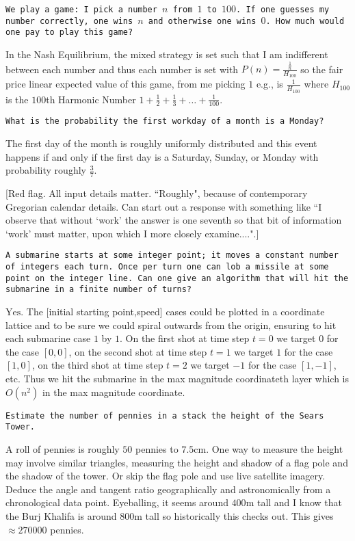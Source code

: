 \texttt{We play a game: I pick a number $n$ from $1$ to $100$. If one guesses my number correctly, one wins $n$ and otherwise one wins $0$. How much would one pay to play this game?}

In the Nash Equilibrium, the mixed strategy is set such that I am indifferent between each number and thus each number is set with $P(n)=\frac{\frac{1}{n}}{H_{100}}$ so the fair price linear expected value of this game, from me picking $1$ e.g., is $\boxed{\frac{1}{H_{100}}}$ where $H_{100}$ is the $100$th Harmonic Number $1+\frac{1}{2}+\frac{1}{3}+\dots+\frac{1}{100}$.

\texttt{What is the probability the first workday of a month is a Monday?}

The first day of the month is roughly uniformly distributed and this event happens if and only if the first day is a Saturday, Sunday, or Monday with probability roughly $\boxed{\frac{3}{7}}$.

[Red flag. All input details matter. ``Roughly", because of contemporary Gregorian calendar details. Can start out a response with something like ``I observe that without `work' the answer is one seventh so that bit of information `work' must matter, upon which I more closely examine....".]

\texttt{A submarine starts at some integer point; it moves a constant number of integers each turn. Once per turn one can lob a missile at some point on the integer line. Can one give an algorithm that will hit the submarine in a finite number of turns?}

$\boxed{\text{Yes}}$. The [initial starting point,speed] cases could be plotted in a coordinate lattice and to be sure we could spiral outwards from the origin, ensuring to hit each submarine case $1$ by $1$. On the first shot at time step $t=0$ we target $0$ for the case $[0,0]$, on the second shot at time step $t=1$ we target $1$ for the case $[1,0]$, on the third shot at time step $t=2$ we target $-1$ for the case $[1,-1]$, etc. Thus we hit the submarine in the max magnitude coordinateth layer which is $O(n^2)$ in the max magnitude coordinate.

\texttt{Estimate the number of pennies in a stack the height of the Sears Tower.}

A roll of pennies is roughly $50$ pennies to $7.5$cm. One way to measure the height may involve similar triangles, measuring the height and shadow of a flag pole and the shadow of the tower. Or skip the flag pole and use live satellite imagery. Deduce the angle and tangent ratio geographically and astronomically from a chronological data point. Eyeballing, it seems around $400$m tall and I know that the Burj Khalifa is around $800$m tall so historically this checks out. This gives $\boxed{\approx 270000}$ pennies.

